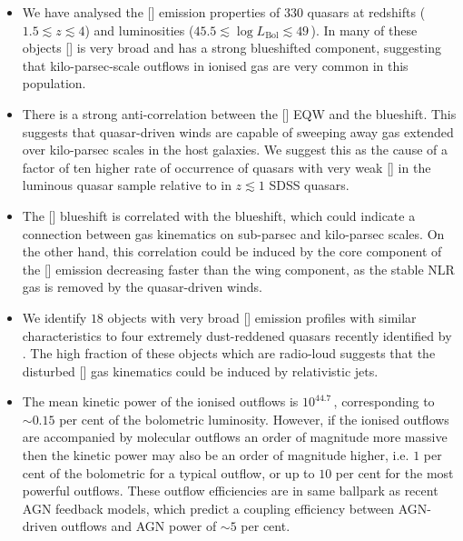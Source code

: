 \begin{itemize}

\item We have analysed the [] emission properties of $330$ quasars at redshifts ($1.5 \lesssim z \lesssim 4$) and luminosities ($45.5 \lesssim \log L_{\text{Bol}} \lesssim 49$\,\ergs). In many of these objects [] is very broad and has a strong blueshifted component, suggesting that kilo-parsec-scale outflows in ionised gas are very common in this population. 

\item There is a strong anti-correlation between the [] EQW and the  blueshift. This suggests that quasar-driven winds are capable of sweeping away gas extended over kilo-parsec scales in the host galaxies. We suggest this as the cause of a factor of ten higher rate of occurrence of quasars with very weak [] in the luminous quasar sample relative to in $z \lesssim 1$ SDSS quasars. 

\item The [] blueshift is correlated with the  blueshift, which could indicate a connection between gas kinematics on sub-parsec and kilo-parsec scales. On the other hand, this correlation could be induced by the core component of the [] emission decreasing faster than the wing component, as the stable NLR gas is removed by the quasar-driven winds.  

\item We identify $18$ objects with very broad [] emission profiles with similar characteristics to four extremely dust-reddened quasars recently identified by \citet{zakamska16}. The high fraction of these objects which are radio-loud suggests that the disturbed [] gas kinematics could be induced by relativistic jets. 

\item The mean kinetic power of the ionised outflows is $10^{44.7}$\,\ergs, corresponding to $\sim0.15$ per cent of the bolometric luminosity. However, if the ionised outflows are accompanied by molecular outflows an order of magnitude more massive then the kinetic power may also be an order of magnitude higher, i.e. $1$ per cent of the bolometric for a typical outflow, or up to $10$ per cent for the most powerful outflows. These outflow efficiencies are in same ballpark as recent AGN feedback models, which predict a coupling efficiency between AGN-driven outflows and AGN power of $\sim5$ per cent.  


\end{itemize}
